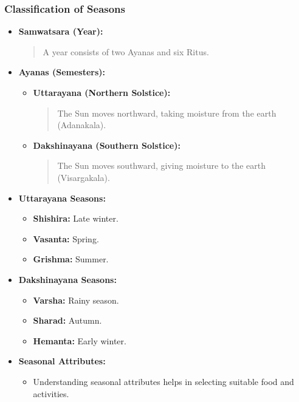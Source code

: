 \begin{frame}[fragile]\frametitle{Classification of Seasons}

      \begin{itemize}
        \item \textbf{Samwatsara (Year):} 
        \begin{quote}
        A year consists of two Ayanas and six Ritus.
        \end{quote}
        \item \textbf{Ayanas (Semesters):} 
        \begin{itemize}
            \item \textbf{Uttarayana (Northern Solstice):}
            \begin{quote}
            The Sun moves northward, taking moisture from the earth (Adanakala).
            \end{quote}
            \item \textbf{Dakshinayana (Southern Solstice):}
            \begin{quote}
            The Sun moves southward, giving moisture to the earth (Visargakala).
            \end{quote}
        \end{itemize}
        \item \textbf{Uttarayana Seasons:}
        \begin{itemize}
            \item \textbf{Shishira:} Late winter.
            \item \textbf{Vasanta:} Spring.
            \item \textbf{Grishma:} Summer.
        \end{itemize}
        \item \textbf{Dakshinayana Seasons:}
        \begin{itemize}
            \item \textbf{Varsha:} Rainy season.
            \item \textbf{Sharad:} Autumn.
            \item \textbf{Hemanta:} Early winter.
        \end{itemize}
        \item \textbf{Seasonal Attributes:} 
        \begin{itemize}
            \item Understanding seasonal attributes helps in selecting suitable food and activities.
        \end{itemize}
      \end{itemize}

\end{frame}

